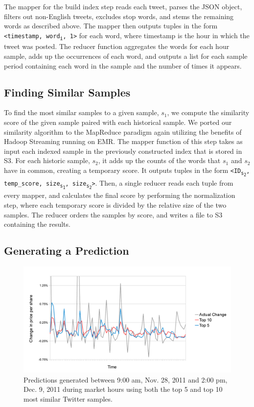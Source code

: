 \documentclass[twocolumn]{article}
\begin{document}
The mapper for the build index step reads each tweet, parses the JSON object, filters out non-English tweets, excludes stop words, and stems the remaining words as described above. The mapper then outputs tuples in the form \texttt{<timestamp, word\textsubscript{i}, 1>} for each word, where timestamp is the hour in which the tweet was posted. The reducer function aggregates the words for each hour sample, adds up the occurrences of each word, and outputs a list for each sample period containing each word in the sample and the number of times it appears.

\subsection{Finding Similar Samples}
To find the most similar samples to a given sample, $s_1$, we compute the similarity score of the given sample paired with each historical sample. We ported our similarity algorithm to the MapReduce paradigm again utilizing the benefits of Hadoop Streaming running on EMR. The mapper function of this step takes as input each indexed sample in the previously constructed index that is stored in S3. For each historic sample, $s_2$, it adds up the counts of the words that $s_1$ and $s_2$ have in common, creating a temporary score. It outputs tuples in the form \texttt{<ID\textsubscript{s\textsubscript{2}}, temp\_score, size\textsubscript{s\textsubscript{1}}, size\textsubscript{s\textsubscript{2}}>}. Then, a single reducer reads each tuple from every mapper, and calculates the final score by performing the normalization step, where each temporary score is divided by the relative size of the two samples. The reducer orders the samples by score, and writes a file to S3 containing the results.

\subsection{Generating a Prediction}

\begin{figure}
\centering
\includegraphics[width=1.0\textwidth]{predictions}
\caption{Predictions generated between 9:00 am, Nov. 28, 2011 and 2:00 pm, Dec. 9, 2011 during market hours using both the top 5 and top 10 most similar Twitter samples.}
\label{predictions}
\end{figure}
\end{document}
